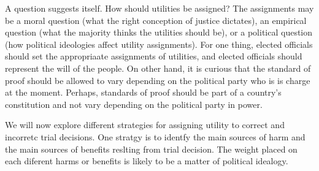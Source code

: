 \documentclass[
  10pt,
  dvipsnames,enabledeprecatedfontcommands]{scrartcl}
\begin{document}
A question suggests itself. How should utilities be assigned? The
assignments may be a moral question (what the right conception of
justice dictates), an empirical question (what the majority thinks the
utilities should be), or a political question (how political ideologies
affect utility assignments). For one thing, elected officials should set
the appropriaate assignments of utilities, and elected officials should
represent the will of the people. On other hand, it is curious that the
standard of proof should be allowed to vary depending on the political
party who is is charge at the moment. Perhaps, standards of proof should
be part of a country's constitution and not vary depending on the
political party in power.

We will now explore different strategies for assigning utility to
correct and incorretc trial decisions. One stratgy is to identfy the
main sources of harm and the main sources of benefits reslting from
trial decision. The weight placed on each diferent harms or benefits is
likely to be a matter of political idealogy.
\end{document}
